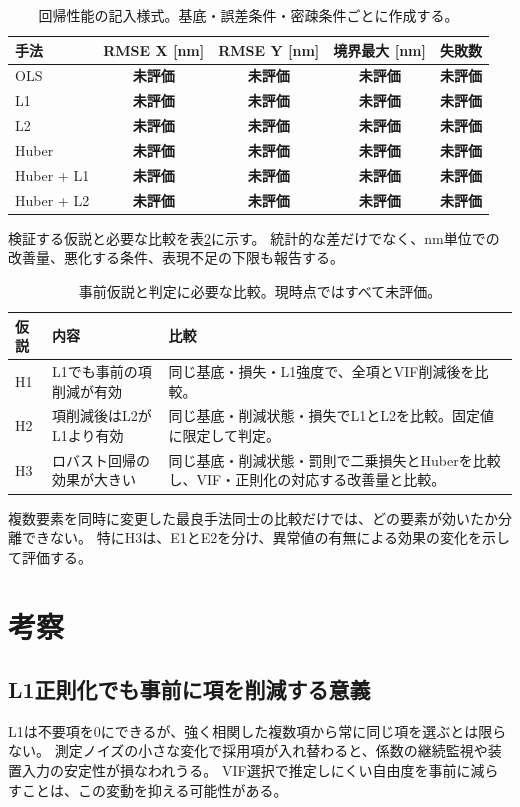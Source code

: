 \documentclass[11pt,a4paper]{ltjsarticle}
\newcommand{\todo}{\textbf{未評価}}
\begin{document}
\begin{table}[htbp]
\centering
\caption{回帰性能の記入様式。基底・誤差条件・密疎条件ごとに作成する。}
\label{tab:performance}
\small
\begin{tabular}{lcccc}
\toprule
手法 & RMSE X [nm] & RMSE Y [nm] & 境界最大 [nm] & 失敗数\\
\midrule
OLS & \todo & \todo & \todo & \todo\\
L1 & \todo & \todo & \todo & \todo\\
L2 & \todo & \todo & \todo & \todo\\
Huber & \todo & \todo & \todo & \todo\\
Huber + L1 & \todo & \todo & \todo & \todo\\
Huber + L2 & \todo & \todo & \todo & \todo\\
\bottomrule
\end{tabular}
\end{table}

検証する仮説と必要な比較を表\ref{tab:hypotheses}に示す。
統計的な差だけでなく、nm単位での改善量、悪化する条件、表現不足の下限も報告する。

\begin{table}[htbp]
\centering
\caption{事前仮説と判定に必要な比較。現時点ではすべて未評価。}
\label{tab:hypotheses}
\begin{tabularx}{\linewidth}{lXX}
\toprule
仮説 & 内容 & 比較\\
\midrule
H1 & L1でも事前の項削減が有効 & 同じ基底・損失・L1強度で、全項とVIF削減後を比較。\\
H2 & 項削減後はL2がL1より有効 & 同じ基底・削減状態・損失でL1とL2を比較。固定値に限定して判定。\\
H3 & ロバスト回帰の効果が大きい & 同じ基底・削減状態・罰則で二乗損失とHuberを比較し、VIF・正則化の対応する改善量と比較。\\
\bottomrule
\end{tabularx}
\end{table}
複数要素を同時に変更した最良手法同士の比較だけでは、どの要素が効いたか分離できない。
特にH3は、E1とE2を分け、異常値の有無による効果の変化を示して評価する。

\section{考察}
\subsection{L1正則化でも事前に項を削減する意義}
L1は不要項を0にできるが、強く相関した複数項から常に同じ項を選ぶとは限らない。
測定ノイズの小さな変化で採用項が入れ替わると、係数の継続監視や装置入力の安定性が損なわれうる。
VIF選択で推定しにくい自由度を事前に減らすことは、この変動を抑える可能性がある。
\end{document}

